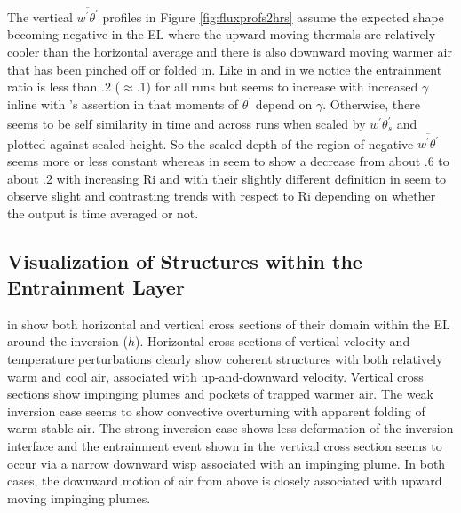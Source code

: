 The vertical $\overline{w^{'}\theta^{'}}$ profiles in Figure \ref{fig:fluxprofs2hrs} assume the expected shape becoming negative in the \acs{EL}
where the upward moving thermals are relatively cooler than the horizontal average and there is also downward
moving warmer air that has been pinched off or folded in.  Like \citeauthor{SullMoengStev} in \cite{SullMoengStev}
and \citeauthor{FedConzMir04} in \cite{FedConzMir04} we notice the entrainment ratio is less than .2 ($\approx .1$) 
for all runs but seems to increase with increased $\gamma$ inline with \citeauthor{Sorbjan}'s assertion in \cite{Sorbjan} 
that moments of $\theta^{'}$ depend on $\gamma$. Otherwise, there seems to be self similarity in time and across runs
when scaled by $\overline{w^{'}\theta^{'}_{s}}$ and plotted against scaled height.  So the scaled depth of the 
region of negative  $\overline{w^{'}\theta^{'}}$ seems more or less constant whereas \citeauthor{FedConzMir04} in 
\cite{FedConzMir04} seem to show a decrease from about .6 to about .2 with increasing \acs{Ri} and \citeauthor{BrooksFowler2}
with their slightly different definition in \cite{BrooksFowler2} seem to observe slight and contrasting trends with
respect to \acs{Ri} depending on whether the output is time averaged or not.




\subsection{Visualization of Structures within the Entrainment Layer}
\FloatBarrier

\citeauthor{SullMoengStev} in \cite{SullMoengStev} show both horizontal and vertical cross sections
of their domain within the \acs{EL} around the inversion ($h$).  Horizontal cross sections of vertical
velocity and temperature perturbations clearly show coherent structures with both relatively
warm and cool air, associated with up-and-downward velocity.  Vertical cross sections show
impinging plumes and pockets of trapped warmer air.  The weak inversion case seems to show
convective overturning with apparent folding of warm stable air.  The strong inversion
case shows less deformation of the inversion interface and the entrainment event 
shown in the vertical cross section seems to occur via a narrow downward wisp associated
with an impinging plume.  In both cases, the downward motion of air from above is closely associated
with upward moving impinging plumes.\\

